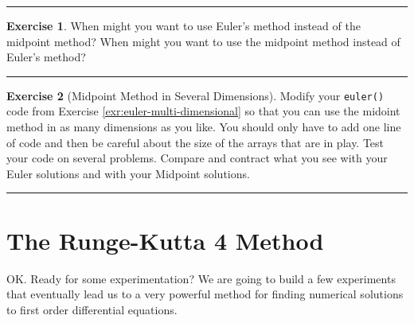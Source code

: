 \documentclass[
]{book}
\theoremstyle{definition}
\theoremstyle{definition}
\theoremstyle{definition}
\newtheorem{exercise}{Exercise}[chapter]
\theoremstyle{remark}
\begin{document}
\begin{center}\rule{0.5\linewidth}{0.5pt}\end{center}

\begin{exercise}
\protect\hypertarget{exr:unnamed-chunk-447}{}{\label{exr:unnamed-chunk-447} }When might you want to use Euler's method instead of the midpoint
method? When might you want to use the midpoint method instead of
Euler's method?
\end{exercise}

\begin{center}\rule{0.5\linewidth}{0.5pt}\end{center}

\begin{exercise}[Midpoint Method in Several Dimensions]
\protect\hypertarget{exr:unnamed-chunk-448}{}{\label{exr:unnamed-chunk-448} {} }Modify your \texttt{euler()} code from Exercise \ref{exr:euler-multi-dimensional} so that you can use the midoint method in as many dimensions as you like. You should only have to add one line of code and then be careful about the size of the arrays that are in play. Test your code on several problems. Compare and contract what you see with your Euler solutions and with your Midpoint solutions.
\end{exercise}

\begin{center}\rule{0.5\linewidth}{0.5pt}\end{center}

\hypertarget{the-runge-kutta-4-method}{%
\section{The Runge-Kutta 4 Method}\label{the-runge-kutta-4-method}}

OK. Ready for some experimentation? We are going to build a few experiments that eventually lead us to a very powerful method for finding numerical solutions to first order differential equations.
\end{document}
